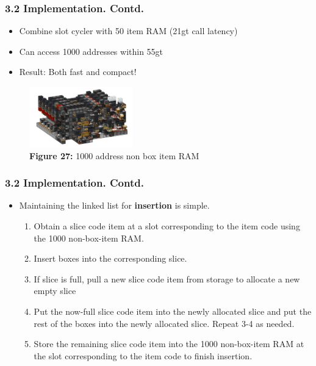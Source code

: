 \documentclass[aspectratio=169]{beamer}
\begin{document}
\begin{frame}
	\frametitle{3.2 Implementation. Contd.}

    \begin{itemize}
		\item Combine slot cycler with 50 item RAM (21gt call latency)
		\item Can access 1000 addresses within 55gt
		\item Result: Both fast and compact!
	\end{itemize}
    \begin{figure}
        \includegraphics[width=0.4\textwidth]{nonbox.png}
        \caption{\textbf{Figure 27:} 1000 address non box item RAM}
    \end{figure}
\end{frame}


\begin{frame}
	\frametitle{3.2 Implementation. Contd.}

    \begin{itemize}
        \item Maintaining the linked list for \textbf{insertion} is simple.
        \begin{enumerate}
            \item Obtain a slice code item at a slot corresponding to the item code using the 1000 non-box-item RAM.
            \item Insert boxes into the corresponding slice.
            \item If slice is full, pull a new slice code item from storage to allocate a new empty slice
            \item Put the now-full slice code item into the newly allocated slice and put the rest of the boxes into the newly allocated slice. Repeat 3-4 as needed.
            \item Store the remaining slice code item into the 1000 non-box-item RAM at the slot corresponding to the item code to finish insertion.
        \end{enumerate}
    \end{itemize}
\end{frame}
\end{document}
